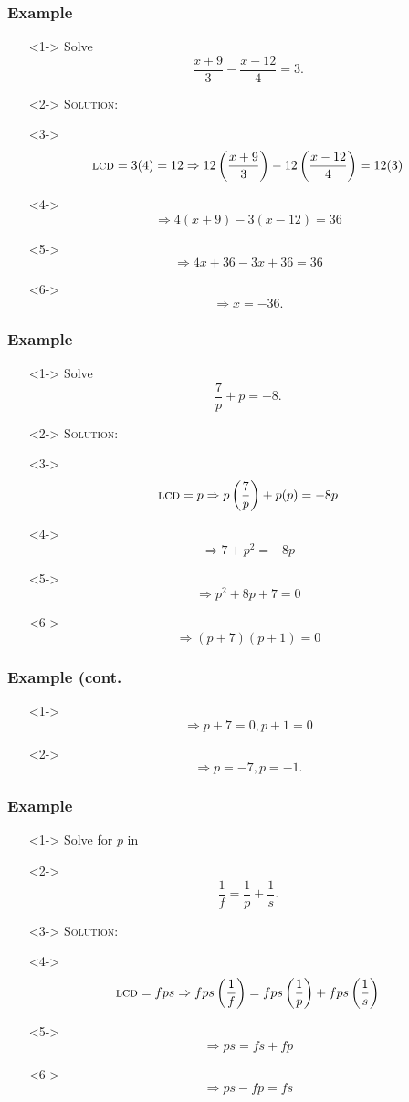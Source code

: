 \documentclass[handout]{beamer}
\begin{document}
\begin{frame}
	\frametitle{Example}
	\begin{enumerate}
		\item[]<1-> Solve
		\[
			\frac{x+9}{3}-\frac{x-12}{4}=3.
		\]
		\item[]<2-> \textsc{Solution:}
		\item[]<3-> \[ \text{\textsc{lcd}}=3(4)=12 \Rightarrow 12 \left( \frac{x+9}{3} \right)-12\left( \frac{x-12}{4} \right)=12(3)  \]
		\item[]<4-> \[ \Rightarrow 4(x+9)-3(x-12)=36\]
		\item[]<5-> \[ \Rightarrow 4x+36-3x+36=36 \]
		\item[]<6-> \[ \Rightarrow x=-36. \]
	\end{enumerate}
\end{frame}

\begin{frame}
	\frametitle{Example}
	\begin{enumerate}
		\item[]<1-> Solve
		\[
			\frac{7}{p}+p=-8.
		\]
		\item[]<2-> \textsc{Solution:}
		\item[]<3-> \[ \text{\textsc{lcd}}=p \Rightarrow p \left( \frac{7}{p} \right) +p(p)=-8p \]
		\item[]<4-> \[ \Rightarrow 7+p^{2}=-8p \]
		\item[]<5-> \[ \Rightarrow p^{2}+8p+7=0 \]
		\item[]<6-> \[ \Rightarrow (p+7)(p+1)=0 \]
	\end{enumerate}
\end{frame}

\begin{frame}
	\frametitle{Example (cont.}
	\begin{enumerate}
		\item[]<1-> \[ \Rightarrow p+7=0, p+1=0 \]
		\item[]<2-> \[\Rightarrow p=-7, p=-1. \]
	\end{enumerate}
\end{frame}

\begin{frame}
	\frametitle{Example}
	\begin{enumerate}
		\item[]<1-> Solve for $p$ in
		\item[]<2-> \[ \frac{1}{f}=\frac{1}{p}+\frac{1}{s}. \]
		\item[]<3-> \textsc{Solution:}
		\item[]<4-> \[ \text{\textsc{lcd}}=fps \Rightarrow fps \left( \frac{1}{f}\right) =fps \left( \frac{1}{p} \right)+fps \left( \frac{1}{s}  \right)\]
		\item[]<5-> \[ \Rightarrow ps=fs+fp \]
		\item[]<6-> \[ \Rightarrow ps-fp=fs \]
	\end{enumerate}
\end{frame}
\end{document}
